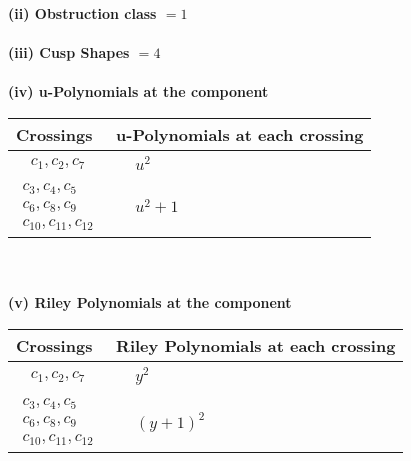 \documentclass[1p]{elsarticle_modified}
\theoremstyle{definition}
\begin{document}
\flushleft \textbf{(ii) Obstruction class $= 1$}\\~\\
\flushleft \textbf{(iii) Cusp Shapes $= 4$}\\~\\
\newpage\renewcommand{\arraystretch}{1}
\flushleft \textbf{(iv) u-Polynomials at the component}\newline \\
\begin{tabular}{m{50pt}|m{274pt}}
Crossings & \hspace{64pt}u-Polynomials at each crossing \\
\hline $$\begin{aligned}c_{1},c_{2},c_{7}\end{aligned}$$&$\begin{aligned}
&u^2
\end{aligned}$\\
\hline $$\begin{aligned}c_{3},c_{4},c_{5}\\c_{6},c_{8},c_{9}\\c_{10},c_{11},c_{12}\end{aligned}$$&$\begin{aligned}
&u^2+1
\end{aligned}$\\
\hline
\end{tabular}\\~\\
\newpage\renewcommand{\arraystretch}{1}
\flushleft \textbf{(v) Riley Polynomials at the component}\newline \\
\begin{tabular}{m{50pt}|m{274pt}}
Crossings & \hspace{64pt}Riley Polynomials at each crossing \\
\hline $$\begin{aligned}c_{1},c_{2},c_{7}\end{aligned}$$&$\begin{aligned}
&y^2
\end{aligned}$\\
\hline $$\begin{aligned}c_{3},c_{4},c_{5}\\c_{6},c_{8},c_{9}\\c_{10},c_{11},c_{12}\end{aligned}$$&$\begin{aligned}
&(y+1)^2
\end{aligned}$\\
\hline
\end{tabular}\\~\\
\end{document}
